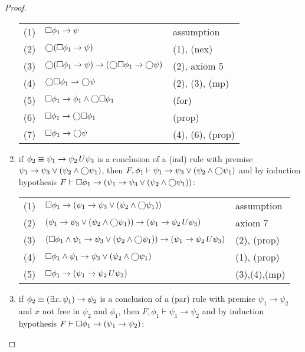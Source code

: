 \begin{proof}
\begin{enumerate}
      \begin{tabularx}{300pt}{cXl}
        (1) & $\Box{\phi_1} \to \psi$ & assumption \\
        (2) & $\bigcirc{(\Box{\phi_1} \to \psi)}$ & (1), (nex) \\
        (3) & $\bigcirc{(\Box{\phi_1} \to \psi)} \to (\bigcirc{\Box{\phi_1}} \to \bigcirc{\psi})$ & (2), axiom 5 \\
        (4) & $\bigcirc{\Box{\phi_1}} \to \bigcirc{\psi}$ & (2), (3), (mp) \\
        (5) & $\Box{\phi_1} \to \phi_1 \land \bigcirc{\Box{\phi_1}}$ & (for) \\
        (6) & $\Box{\phi_1} \to \bigcirc{\Box{\phi_1}}$ & (prop) \\
        (7) & $\Box{\phi_1} \to \bigcirc{\psi}$ & (4), (6), (prop) \\
      \end{tabularx}

    \item if $\phi_2 \equiv \psi_1 \to {\psi_2}\,U {\psi_3}$ is a conclusion of a (ind) rule with premise $\psi_1 \to
      \psi_3 \lor (\psi_2 \land \bigcirc{\psi_1})$, then $F, \phi_1 \vdash \psi_1 \to \psi_3 \lor (\psi_2 \land
      \bigcirc{\psi_1})$ and by induction hypothesis $F \vdash \Box{\phi_1} \to (\psi_1 \to \psi_3 \lor (\psi_2 \land
      \bigcirc{\psi_1}))$:

      \begin{tabularx}{300pt}{cXl}
        (1) & $\Box{\phi_1} \to (\psi_1 \to \psi_3 \lor (\psi_2 \land \bigcirc{\psi_1}))$ & assumption \\
        (2) & $(\psi_1 \to \psi_3 \lor (\psi_2 \land \bigcirc{\psi_1})) \to (\psi_1 \to {\psi_2}\,U {\psi_3})$ & axiom 7\\
        (3) & $(\Box{\phi_1} \land \psi_1 \to \psi_3 \lor (\psi_2 \land \bigcirc{\psi_1})) \to (\psi_1 \to
        {\psi_2}\,U {\psi_3})$ & (2), (prop) \\
        (4) & $\Box{\phi_1} \land \psi_1 \to \psi_3 \lor (\psi_2 \land \bigcirc{\psi_1})$ & (1), (prop) \\
        (5) & $\Box{\phi_1} \to (\psi_1 \to {\psi_2}\,U {\psi_3})$ & (3),(4),(mp) \\
      \end{tabularx}

    \item if $\phi_2 \equiv (\exists {x} \ldotp {\psi_1}) \to \psi_2$ is a conclusion of a (par) rule with premise $\psi_1 \to
      \psi_2$ and $x$ not free in $\psi_2$ and $\phi_1$, then $F, \phi_1 \vdash \psi_1 \to \psi_2$ and by induction
      hypothesis $F \vdash \Box{\phi_1} \to (\psi_1 \to \psi_2)$:


\end{enumerate}
\end{proof}
